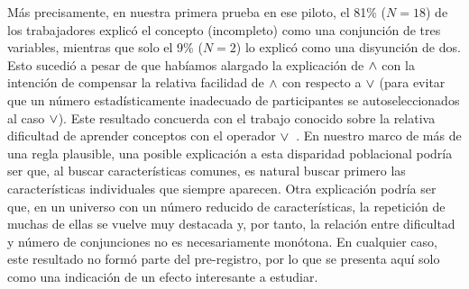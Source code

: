 Más precisamente, en nuestra primera prueba en ese piloto, el 81\% ($ N = 18 $) de los trabajadores explicó el concepto (incompleto) como una conjunción de tres variables, mientras que solo el 9\% ($ N = 2 $) lo explicó como una disyunción de dos. Esto sucedió a pesar de que habíamos alargado la explicación de $ \land $ con la intención de compensar la relativa facilidad de $ \land $ con respecto a $ \lor $ (para evitar que un número estadísticamente inadecuado de participantes se autoseleccionados al caso $ \lor $). Este resultado concuerda con el trabajo conocido sobre la relativa dificultad de aprender conceptos con el operador $ \lor $~\cite{bourne1970knowing}. En nuestro marco de más de una regla plausible, una posible explicación a esta disparidad poblacional podría ser que, al buscar características comunes, es natural buscar primero las características individuales que siempre aparecen. Otra explicación podría ser que, en un universo con un número reducido de características, la repetición de muchas de ellas se vuelve muy destacada y, por tanto, la relación entre dificultad y número de conjunciones no es necesariamente monótona. En cualquier caso, este resultado no formó parte del pre-registro, por lo que se presenta aquí solo como una indicación de un efecto interesante a estudiar.



